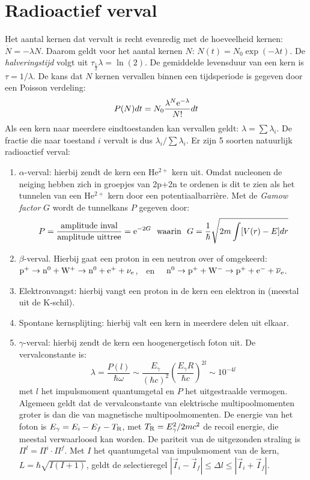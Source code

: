 \section{Radioactief verval}
Het aantal kernen dat vervalt is recht evenredig met de hoeveelheid kernen:
$\dot{N}=-\lambda N$. Daarom geldt voor het aantal kernen $N$:
$N(t)=N_0\exp(-\lambda t)$. De {\it halveringstijd} volgt uit
$\tau_{\frac{1}{2}}\lambda=\ln(2)$. De gemiddelde levensduur van een kern is
$\tau=1/\lambda$. De kans dat $N$ kernen vervallen binnen een tijdsperiode
is gegeven door een Poisson verdeling:
\[
P(N)dt=N_0\frac{\lambda^N{\rm e}^{-\lambda}}{N!}dt
\]
Als een kern naar meerdere eindtoestanden kan vervallen geldt:
$\lambda=\sum\lambda_i$. De fractie die naar toestand $i$ vervalt is dus
$\lambda_i/\sum\lambda_i$. Er zijn 5 soorten natuurlijk radioactief verval:
\begin{enumerate}
\item $\alpha$-verval: hierbij zendt de kern een He$^{2+}$ kern uit. Omdat
      nucleonen de neiging hebben zich in groepjes van 2p+2n te ordenen is
      dit te zien als het tunnelen van een He$^{2+}$ kern door een
      potentiaalbarri\`ere. Met de {\it Gamow factor} $G$ wordt de tunnelkans
      $P$ gegeven door:
      \[
      P=\frac{\mbox{amplitude inval}}{\mbox{amplitude uittree}}={\rm e}^{-2G}~~\mbox{waarin}~~
      G=\frac{1}{\hbar}\sqrt{2m\int[V(r)-E]dr}
      \]
\item $\beta$-verval. Hierbij gaat een proton in een neutron over of omgekeerd:\\
      $\rm p^+\rightarrow n^0+W^+\rightarrow n^0+e^++\nu_e$,~~en~~
      $\rm n^0\rightarrow p^++W^-\rightarrow p^++e^-+\overline{\nu}_e$.
\item Elektronvangst: hierbij vangt een proton in de kern een elektron in
      (meestal uit de K-schil).
\item Spontane kernsplijting: hierbij valt een kern in meerdere delen uit elkaar.
\item $\gamma$-verval: hierbij zendt de kern een hoogenergetisch foton uit.
      De vervalconstante is:
      \[
      \lambda=\frac{P(l)}{\hbar\omega}\sim\frac{E_\gamma}{(\hbar c)^2}\left(\frac{E_\gamma R}{\hbar c}\right)^{2l}\sim10^{-4l}
      \]
      met $l$ het impulsmoment quantumgetal en $P$ het uitgestraalde
      vermogen. Algemeen geldt dat de vervalconstante van elektrische
      multipoolmomenten groter is dan die van magnetische multipoolmomenten.
      De energie van het foton is $E_\gamma=E_i-E_f-T_{\rm R}$, met $T_{\rm
      R}=E_{\gamma}^2/2mc^2$ de recoil energie, die meestal verwaarloosd kan
      worden. De pariteit van de uitgezonden straling is
      $\Pi^l=\Pi^i\cdot\Pi^f$. Met $I$ het quantumgetal van impulsmoment van
      de kern, $L=\hbar\sqrt{I(I+1)}$, geldt de selectieregel
      $|\vec{I}_i-\vec{I}_f|\leq\Delta l\leq|\vec{I}_i+\vec{I}_f|$.
\end{enumerate}

